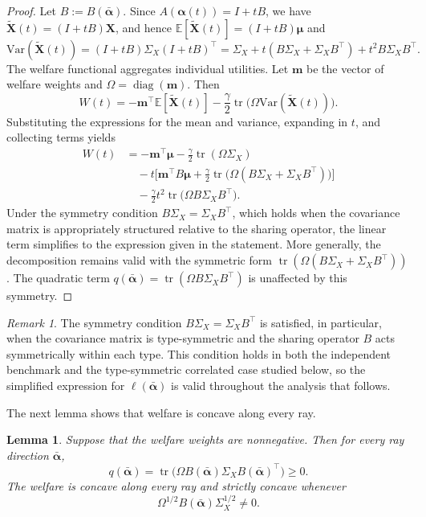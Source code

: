 \documentclass[a4paper,12pt]{article}
\newtheorem{lemma}[theorem]{Lemma}
\theoremstyle{definition}
\theoremstyle{remark}
\newtheorem{remark}[theorem]{Remark}
\newcommand{\E}{\mathbb{E}}
\newcommand{\Var}{\mathrm{Var}}
\newcommand{\1}{\mathbf{1}}
\begin{document}
\begin{proof}
Let \(B:=B(\bar{\boldsymbol{\alpha}})\). Since \(A(\boldsymbol{\alpha}(t))=I+tB\), we have
\(\tilde{\mathbf X}(t)=(I+tB)\mathbf X\), and hence
\(\E[\tilde{\mathbf X}(t)]=(I+tB)\boldsymbol{\mu}\)
and
\[
\Var(\tilde{\mathbf X}(t))
=
(I+tB)\Sigma_X(I+tB)^\top
=
\Sigma_X+t(B\Sigma_X+\Sigma_XB^\top)+t^2B\Sigma_XB^\top.
\]
The welfare functional aggregates individual utilities. Let \(\mathbf m\) be the vector of welfare weights and \(\Omega = \operatorname{diag}(\mathbf m)\). Then
\[
W(t) = -\mathbf m^\top \E[\tilde{\mathbf X}(t)] - \frac{\gamma}{2}\operatorname{tr}\!\big(\Omega \Var(\tilde{\mathbf X}(t))\big).
\]
Substituting the expressions for the mean and variance, expanding in \(t\), and collecting terms yields
\begin{align*}
W(t) &= -\mathbf m^\top\boldsymbol{\mu} - \frac{\gamma}{2}\operatorname{tr}(\Omega\Sigma_X) \\
&\quad - t\Big[\mathbf m^\top B\boldsymbol{\mu} + \frac{\gamma}{2}\operatorname{tr}\!\big(\Omega(B\Sigma_X+\Sigma_XB^\top)\big)\Big] \\
&\quad - \frac{\gamma}{2}t^2\operatorname{tr}\!\big(\Omega B\Sigma_X B^\top\big).
\end{align*}
Under the symmetry condition \(B\Sigma_X = \Sigma_X B^\top\), which holds when the covariance matrix is appropriately structured relative to the sharing operator, the linear term simplifies to the expression given in the statement. More generally, the decomposition remains valid with the symmetric form \(\operatorname{tr}(\Omega(B\Sigma_X+\Sigma_XB^\top))\). The quadratic term \(q(\bar{\boldsymbol{\alpha}})=\operatorname{tr}(\Omega B\Sigma_X B^\top)\) is unaffected by this symmetry.
\end{proof}

\begin{remark}
The symmetry condition \(B\Sigma_X = \Sigma_X B^\top\) is satisfied, in particular, when the covariance matrix is type-symmetric and the sharing operator \(B\) acts symmetrically within each type. This condition holds in both the independent benchmark and the type-symmetric correlated case studied below, so the simplified expression for \(\ell(\bar{\boldsymbol{\alpha}})\) is valid throughout the analysis that follows.
\end{remark}

The next lemma shows that welfare is concave along every ray.
\begin{lemma}\label{lem:concavity-general}
Suppose that the welfare weights are nonnegative. Then for every ray direction
\(\bar{\boldsymbol{\alpha}}\),
\[
q(\bar{\boldsymbol{\alpha}})
=
\operatorname{tr}\!\bigl(\Omega B(\bar{\boldsymbol{\alpha}})\Sigma_X
B(\bar{\boldsymbol{\alpha}})^\top\bigr)
\ge 0.
\]
The welfare is concave along every ray and strictly concave whenever
\[
\Omega^{1/2}B(\bar{\boldsymbol{\alpha}})\Sigma_X^{1/2}\neq 0.
\]
\end{lemma}
\end{document}
